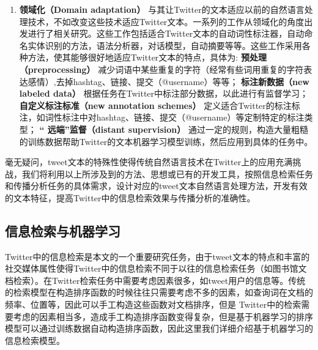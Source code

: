 \begin{enumerate}
\item \textbf{领域化（Domain adaptation）} 与其让Twitter的文本适应以前的自然语言处理技术，不如改变这些技术适应Twitter文本。一系列的工作从领域化的角度出发进行了相关研究。这些工作包括适合Twitter文本的自动词性标注器，自动命名实体识别的方法，语法分析器，对话模型，自动摘要等等。这些工作采用各种方法，使其能够很好地适应Twitter文本的特点，具体为:
\subitem \textbf{预处理（preprocessing）} 减少词语中某些重复的字符（经常有些词用重复的字符表达感情）,去掉hashtag、链接、提交（@username）等等；
\subitem  \textbf{标注新数据（new labeled data）} 根据任务在Twitter中标注部分数据，以此进行有监督学习；
\subitem \textbf{自定义标注标准（new annotation schemes）} 定义适合Twitter的标注标注，如词性标注中对hashtag、链接、提交（@username）等定制特定的标注类型；
\subitem \textbf{“	远端”监督（distant supervision）} 通过一定的规则，构造大量粗糙的训练数据帮助Twitter的文本机器学习模型训练，然后应用到具体的任务中。
\end{enumerate}

毫无疑问，tweet文本的特殊性使得传统自然语言技术在Twitter上的应用充满挑战，我们将利用以上所涉及到的方法、思想或已有的开发工具，按照信息检索任务和传播分析任务的具体需求，设计对应的tweet文本自然语言处理方法，开发有效的文本特征，提高Twitter中的信息检索效果与传播分析的准确性。

\subsection{信息检索与机器学习}
\label{rel2}
Twitter中的信息检索是本文的一个重要研究任务，由于tweet文本的特点和丰富的社交媒体属性使得Twitter中的信息检索不同于以往的信息检索任务（如图书馆文档检索）。在Twitter检索任务中需要考虑因素很多，如tweet用户的信息等。传统的检索模型在构造排序函数的时候往往只需要考虑不多的因素，如查询词在文档的频率、位置等，因此可以手工构造这些函数对文档排序，但是 Twitter中的检索需要考虑的因素相当多，造成手工构造排序函数变得复杂，但是基于机器学习的排序模型可以通过训练数据自动构造排序函数，因此这里我们详细介绍基于机器学习的信息检索模型。


